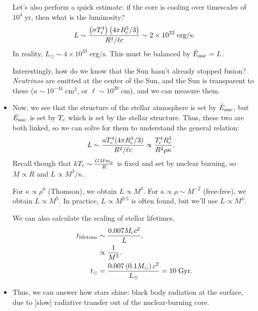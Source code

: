 \documentclass[11pt,
        usenames, %
        dvipsnames %
    ]{article}
\newcommand*{\scinot}[2]{#1\times10^{#2}}
\newcommand*{\p}[1]{\left(#1\right)}
\begin{document}
\begin{itemize}
        Let's also perform a quick estimate: if the core is cooling over
        timescales of $10^4\;\mathrm{yr}$, then what is the luminosity?
        \begin{equation}
            L \sim \frac{\p{\sigma T_{\rm c}^4}\p{4\pi R_{\rm c}^3/3}}{
                R^2 / \ell c} \sim \scinot{2}{33}\;\mathrm{erg/s}.
        \end{equation}
        In reality, $L_{\odot} \sim \scinot{4}{33}\;\mathrm{erg/s}$. This must
        be balanced by $\dot{E}_{\rm nuc} = L$.

        Interestingly, how do we know that the Sun hasn't already stopped
        fusion? \emph{Neutrinos} are emitted at the center of the Sun, and the
        Sun is transparent to these ($a \sim 10^{-44}\;\mathrm{cm^2}$,
        or $\ell \sim 10^{20}\;\mathrm{cm}$), and we can measure them.

    \item Now, we see that the structure of the stellar atmosphere is set by
        $\dot{E}_{\rm nuc}$, but $\dot{E}_{\rm nuc}$ is set by $T_{\rm c}$ which
        is set by the stellar structure. Thus, these two are both linked, so we
        can solve for them to understand the general relation:
        \begin{align}
            L &\sim \frac{a T_{\rm c}^4 (4\pi R_{\rm c}^3/3)}{R^2/\ell c}
                \propto \frac{T_{\rm c}^4 R_{\rm c}^3}{R^2 \rho \kappa}.
        \end{align}
        Recall though that $kT_{\rm c} \sim \frac{GMm_{\rm p}}{R}$ is fixed and
        set by nuclear burning, so $M \propto R$ and $L \propto M^3/\kappa$.

        For $\kappa \propto \rho^0$ (Thomson), we obtain $L \propto M^3$. For
        $\kappa \propto \rho \sim M^{-2}$ (free-free), we obtain $L \propto
        M^5$. In practice, $L \propto M^{3.5}$ is often found, but we'll use $L
        \propto M^4$.

        We can also calculate the scaling of stellar lifetimes,
        \begin{align}
            t_{\rm lifetime} &\sim \frac{0.007 M_{\rm c}c^2}{L},\\
                &\propto \frac{1}{M^3}.\\
            t_{\odot} &= \frac{0.007\p{0.1M_{\odot}}c^2}{L_{\odot}}
                = 10\;\mathrm{Gyr}.
        \end{align}

    \item Thus, we can answer how stars shine: black body radiation at the
        surface, due to [slow] radiative transfer out of the nuclear-burning
        core.


\end{itemize}
\end{document}
